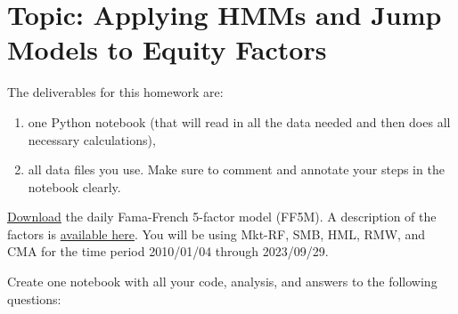 \documentclass[11pt]{article}
\theoremstyle{plain} %
\theoremstyle{remark}
\begin{document}
\section{Topic: Applying HMMs and Jump Models to Equity Factors}

The deliverables for this homework are: 
\begin{enumerate}
  \item one Python notebook (that will read in all the data needed and then does
  all necessary calculations),
  \item all data files you use. Make sure to comment and annotate your steps in
  the notebook clearly.
\end{enumerate}

\href{https://mba.tuck.dartmouth.edu/pages/faculty/ken.french/ftp/F-F_Research_Data_5_Factors_2x3_daily_CSV.zip}{Download}
the daily Fama-French 5-factor model (FF5M). A description of the factors is
\href{https://mba.tuck.dartmouth.edu/pages/faculty/ken.french/Data_Library/f-f_5_factors_2x3.html}{available
here}. You will be using Mkt-RF, SMB, HML, RMW, and CMA for the time period
2010/01/04 through 2023/09/29.

Create one notebook with all your code, analysis, and answers to the following
questions:
\end{document}
